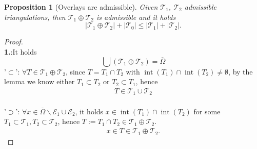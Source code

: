 \documentclass[a4paper,12pt,oneside,fleqn]{book}
\newtheorem{proposition}[theorem]{Proposition}
\theoremstyle{definition}
\theoremstyle{remark}
\DeclareMathOperator*{\interior}{int}
\begin{document}
\begin{proposition}[Overlays are admissible]
	Given $\mathcal{T}_1$, $\mathcal{T}_2$ admissible triangulations, then $\mathcal{T}_1 \oplus \mathcal{T}_2$ is admissible and it holds
	\begin{equation}
		|\mathcal{T}_1 \oplus \mathcal{T}_2| + |\mathcal{T}_0| \le |\mathcal{T}_1| + |\mathcal{T}_2|. 
	\end{equation}
\end{proposition}
\begin{proof}
\quad\\
\textbf{1.}:It holds
\begin{equation}
	\bigcup (\mathcal{T}_1 \oplus \mathcal{T}_2) = \overline{\Omega}
\end{equation}
'$\subset$': $\forall T \in \mathcal{T}_1 \oplus \mathcal{T}_2$, since $T = T_1 \cap T_2$ with $\interior(T_1) \cap \interior(T_2) \neq \emptyset$, by the lemma we know either $T_1 \subset T_2$ or $T_2 \subset T_1$, hence 
\begin{align*}
	T \in \mathcal{T}_1 \cup \mathcal{T}_2
\end{align*}
\qquad\\
'$\supset$': $\forall x \in \overline{\Omega}\backslash \mathcal{E}_1 \cup \mathcal{E}_2$, it holds $x \in \interior(T_1) \cap \interior(T_2)$ for some $T_1 \subset \mathcal{T}_1, T_2 \subset \mathcal{T}_2$, hence $T := T_1 \cap T_2 \in \mathcal{T}_1 \oplus \mathcal{T}_2$. 
\begin{align*}
	x \in T \in \mathcal{T}_1 \oplus \mathcal{T}_2. 
\end{align*}


\end{proof}
\end{document}
